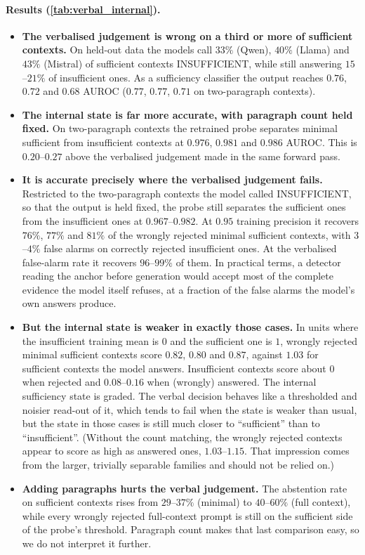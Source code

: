 \paragraph{Results (\cref{tab:verbal_internal}).}
\begin{itemize}
  \item \textbf{The verbalised judgement is wrong on a third or more of sufficient contexts.} On held-out data the models call $33\%$ (Qwen), $40\%$ (Llama) and $43\%$ (Mistral) of sufficient contexts INSUFFICIENT, while still answering $15$--$21\%$ of insufficient ones. As a sufficiency classifier the output reaches $0.76$, $0.72$ and $0.68$ AUROC ($0.77$, $0.77$, $0.71$ on two-paragraph contexts).
  \item \textbf{The internal state is far more accurate, with paragraph count held fixed.} On two-paragraph contexts the retrained probe separates minimal sufficient from insufficient contexts at $0.976$, $0.981$ and $0.986$ AUROC. This is $0.20$--$0.27$ above the verbalised judgement made in the same forward pass.
  \item \textbf{It is accurate precisely where the verbalised judgement fails.} Restricted to the two-paragraph contexts the model called INSUFFICIENT, so that the output is held fixed, the probe still separates the sufficient ones from the insufficient ones at $0.967$--$0.982$. At $0.95$ training precision it recovers $76\%$, $77\%$ and $81\%$ of the wrongly rejected minimal sufficient contexts, with $3$--$4\%$ false alarms on correctly rejected insufficient ones. At the verbalised false-alarm rate it recovers $96$--$99\%$ of them. In practical terms, a detector reading the anchor before generation would accept most of the complete evidence the model itself refuses, at a fraction of the false alarms the model's own answers produce.
  \item \textbf{But the internal state is weaker in exactly those cases.} In units where the insufficient training mean is $0$ and the sufficient one is $1$, wrongly rejected minimal sufficient contexts score $0.82$, $0.80$ and $0.87$, against $1.03$ for sufficient contexts the model answers. Insufficient contexts score about $0$ when rejected and $0.08$--$0.16$ when (wrongly) answered. The internal sufficiency state is graded. The verbal decision behaves like a thresholded and noisier read-out of it, which tends to fail when the state is weaker than usual, but the state in those cases is still much closer to ``sufficient'' than to ``insufficient''. (Without the count matching, the wrongly rejected contexts appear to score as high as answered ones, $1.03$--$1.15$. That impression comes from the larger, trivially separable families and should not be relied on.)
  \item \textbf{Adding paragraphs hurts the verbal judgement.} The abstention rate on sufficient contexts rises from $29$--$37\%$ (minimal) to $40$--$60\%$ (full context), while every wrongly rejected full-context prompt is still on the sufficient side of the probe's threshold. Paragraph count makes that last comparison easy, so we do not interpret it further.
\end{itemize}

